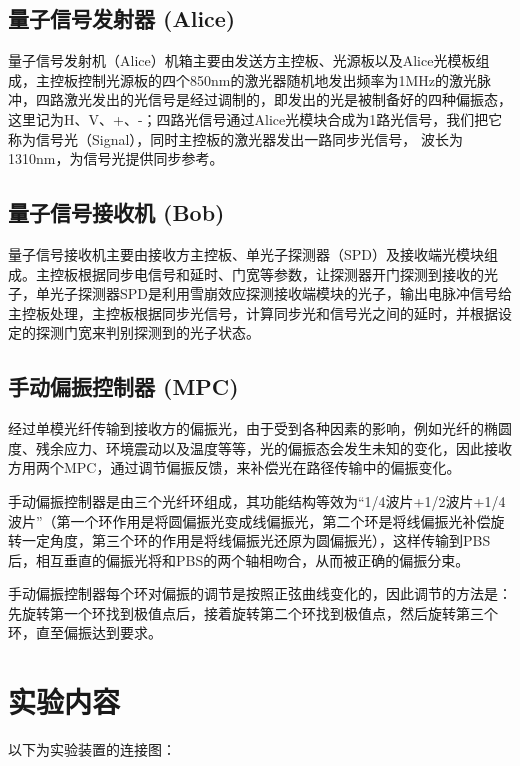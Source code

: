 \documentclass[a4paper,UTF8]{ctexart}
\begin{document}
\subsection{量子信号发射器 (Alice)}

量子信号发射机（Alice）机箱主要由发送方主控板、光源板以及Alice光模板组成，主控板控制光源板的四个850nm的激光器随机地发出频率为1MHz的激光脉冲，四路激光发出的光信号是经过调制的，即发出的光是被制备好的四种偏振态，这里记为H、V、+、-；四路光信号通过Alice光模块合成为1路光信号，我们把它称为信号光（Signal），同时主控板的激光器发出一路同步光信号，
波长为1310nm，为信号光提供同步参考。

\subsection{量子信号接收机 (Bob)}

量子信号接收机主要由接收方主控板、单光子探测器（SPD）及接收端光模块组成。主控板根据同步电信号和延时、门宽等参数，让探测器开门探测到接收的光子，单光子探测器SPD是利用雪崩效应探测接收端模块的光子，输出电脉冲信号给主控板处理，主控板根据同步光信号，计算同步光和信号光之间的延时，并根据设定的探测门宽来判别探测到的光子状态。

\subsection{手动偏振控制器 (MPC)}

经过单模光纤传输到接收方的偏振光，由于受到各种因素的影响，例如光纤的椭圆度、残余应力、环境震动以及温度等等，光的偏振态会发生未知的变化，因此接收方用两个MPC，通过调节偏振反馈，来补偿光在路径传输中的偏振变化。

手动偏振控制器是由三个光纤环组成，其功能结构等效为“1/4波片+1/2波片+1/4波片”（第一个环作用是将圆偏振光变成线偏振光，第二个环是将线偏振光补偿旋转一定角度，第三个环的作用是将线偏振光还原为圆偏振光），这样传输到PBS后，相互垂直的偏振光将和PBS的两个轴相吻合，从而被正确的偏振分束。

手动偏振控制器每个环对偏振的调节是按照正弦曲线变化的，因此调节的方法是：先旋转第一个环找到极值点后，接着旋转第二个环找到极值点，然后旋转第三个环，直至偏振达到要求。


\section{实验内容}

以下为实验装置的连接图：
\end{document}

